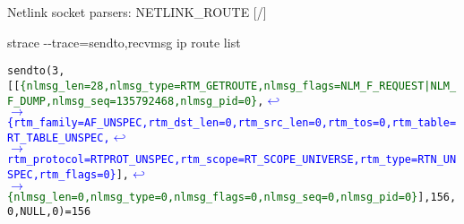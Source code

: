 \documentclass[unicode,aspectratio=169,xcolor={table,dvipsnames,usernames}]{beamer}
\newcommand{\symlinebreak}{\textcolor{blue}{\(\hookleftarrow\)}}
\newcommand{\symlinecont}{\textcolor{blue}{\(\longrightarrow\)}}
\begin{document}
\begin{frame}[fragile]{Netlink socket parsers: NETLINK\_ROUTE \hfill [\insertframenumber/\inserttotalframenumber]}
\tiny
\begin{block}{\large strace -{}-trace=sendto,recvmsg ip route list}
\begin{alltt}
sendto(3, [[\textcolor{darkgreen}{\{nlmsg_len=28, nlmsg_type=RTM_GETROUTE, nlmsg_flags=NLM_F_REQUEST|NLM_F_DUMP, nlmsg_seq=135792468, nlmsg_pid=0\}}, \symlinebreak
\symlinecont \textcolor{blue}{\{rtm_family=AF_UNSPEC, rtm_dst_len=0, rtm_src_len=0, rtm_tos=0, rtm_table=RT_TABLE_UNSPEC, \symlinebreak
\symlinecont rtm_protocol=RTPROT_UNSPEC, rtm_scope=RT_SCOPE_UNIVERSE, rtm_type=RTN_UNSPEC, rtm_flags=0\}}], \symlinebreak
\symlinecont \textcolor{darkgreen}{\{nlmsg_len=0, nlmsg_type=0, nlmsg_flags=0, nlmsg_seq=0, nlmsg_pid=0\}}], 156, 0, NULL, 0) = 156


\end{alltt}
\end{block}
\end{frame}
\end{document}
